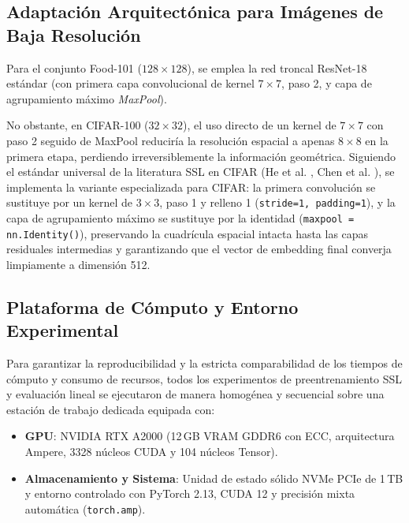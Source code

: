 \subsection{Adaptación Arquitectónica para Imágenes de Baja Resolución}
Para el conjunto Food-101 ($128 \times 128$), se emplea la red troncal ResNet-18 estándar (con primera capa convolucional de kernel $7 \times 7$, paso 2, y capa de agrupamiento máximo \textit{MaxPool}). 

No obstante, en CIFAR-100 ($32 \times 32$), el uso directo de un kernel de $7 \times 7$ con paso 2 seguido de MaxPool reduciría la resolución espacial a apenas $8 \times 8$ en la primera etapa, perdiendo irreversiblemente la información geométrica. Siguiendo el estándar universal de la literatura SSL en CIFAR (He et al. \cite{he2016deep}, Chen et al. \cite{chen2020simclr}), se implementa la variante especializada para CIFAR: la primera convolución se sustituye por un kernel de $3 \times 3$, paso 1 y relleno 1 (\texttt{stride=1, padding=1}), y la capa de agrupamiento máximo se sustituye por la identidad (\texttt{maxpool = nn.Identity()}), preservando la cuadrícula espacial intacta hasta las capas residuales intermedias y garantizando que el vector de embedding final converja limpiamente a dimensión 512.

\subsection{Plataforma de Cómputo y Entorno Experimental}
Para garantizar la reproducibilidad y la estricta comparabilidad de los tiempos de cómputo y consumo de recursos, todos los experimentos de preentrenamiento SSL y evaluación lineal se ejecutaron de manera homogénea y secuencial sobre una estación de trabajo dedicada equipada con:
\begin{itemize}
    \item \textbf{GPU}: NVIDIA RTX A2000 (12\,GB VRAM GDDR6 con ECC, arquitectura Ampere, 3328 núcleos CUDA y 104 núcleos Tensor).
    \item \textbf{Almacenamiento y Sistema}: Unidad de estado sólido NVMe PCIe de 1\,TB y entorno controlado con PyTorch 2.13, CUDA 12 y precisión mixta automática (\texttt{torch.amp}).
\end{itemize}


